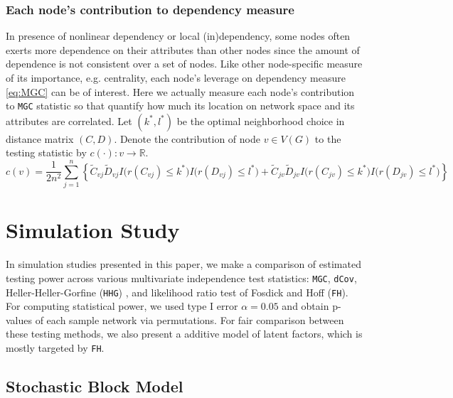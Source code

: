 \documentclass[12pt]{article}
\theoremstyle{definition}
\begin{document}
\subsubsection{Each node's contribution to dependency measure}

In presence of nonlinear dependency or local (in)dependency, some nodes often exerts more dependence on their attributes than other nodes since the amount of dependence is not consistent over a set of nodes. Like other node-specific measure of its importance, e.g. centrality, each node's leverage on dependency measure \ref{eq:MGC} can be of interest. Here we actually measure each node's contribution to \texttt{MGC} statistic so that quantify how much its location on network space and its attributes are correlated.
Let $(k^{*}, l^{*})$ be the optimal neighborhood choice in distance matrix $(C, D)$.  Denote the contribution of node $v \in V(G)$ to the testing statistic by  $c(\cdot) : v \rightarrow \mathbb{R}$. 
\begin{equation}
\label{contribution}
c(v) = \frac{1}{2 n^2} \sum\limits_{j=1}^{n} \left\{     \tilde{C}_{v j} \tilde{D}_{v j} I \big(  r (C_{v j}) \leq k^{*}  \big) I \big( r (D_{ v j }) \leq l^{*} \big) + \tilde{C}_{j v} \tilde{D}_{j v} I \big(  r (C_{j v}) \leq k^{*}  \big) I \big( r (D_{j v}) \leq l^{*} \big) \right\} 
\end{equation}

\section{Simulation Study}
\label{sec:sim}
	
In simulation studies presented in this paper, we make a comparison of estimated testing power across various multivariate independence test statistics: \texttt{MGC}, \texttt{dCov}, Heller-Heller-Gorfine (\texttt{HHG}) \citep{heller2012consistent}, and likelihood ratio test of Fosdick and Hoff (\texttt{FH}). For computing statistical power, we used type I error $\alpha = 0.05$ and obtain p-values of each sample network via permutations. For fair comparison between these testing methods, we also present a additive model of latent factors, which is mostly targeted by \texttt{FH}.   
	
\subsection{Stochastic Block Model}
\end{document}
